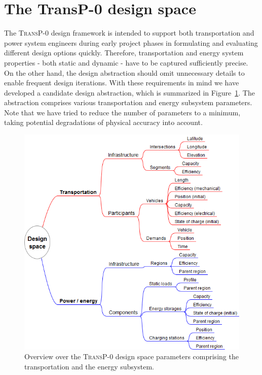 \section{The \textbf{TransP-0} design space}
\label{proposed_model}

The \textsc{TransP-0} design framework is intended to support both transportation and power system engineers
during early project phases 
in formulating and evaluating different design options quickly. Therefore, transportation and energy system properties - both static and dynamic - have to be captured sufficiently precise. On the other hand, the design abstraction should omit unnecessary details to enable frequent design iterations. With these requirements in mind we have developed a candidate design abstraction, which is summarized in Figure~\ref{system_design}. The abstraction comprises various transportation and energy subsystem parameters. Note that we have tried to reduce the number of parameters to a minimum, taking potential degradations of physical accuracy into account.

\begin{figure}[h!]
	\begin{center}
	\includegraphics[trim=0 10 0 0, width=0.875\columnwidth]{./gfx/system_design.png}
	\caption{Overview over the \textsc{TransP-0} design space parameters comprising the transportation and the energy subsystem.}
	\label{system_design}
	\end{center}
\end{figure}

